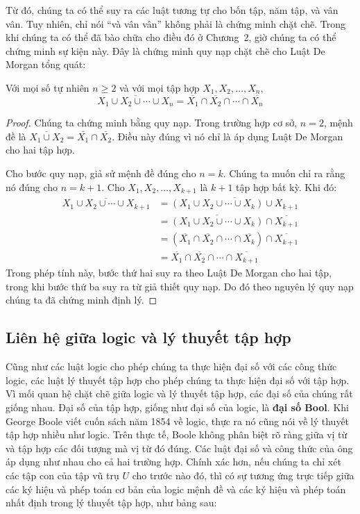 Từ đó, chúng ta có thể suy ra các luật tương tự cho bốn tập, năm tập, và vân vân. Tuy nhiên, chỉ nói ``và vân vân'' không phải là chứng minh chặt chẽ. Trong khi chúng ta có thể đã bào chữa cho điều đó ở Chương~2, giờ chúng ta có thể chứng minh sự kiện này. Đây là chứng minh quy nạp chặt chẽ cho Luật De Morgan tổng quát:

\begin{theorem}
\label{thm:4.5}
Với mọi số tự nhiên $n \geq 2$ và với mọi tập hợp $X_1, X_2, \ldots, X_n$,
\[
\overline{X_1 \cup X_2 \cup \cdots \cup X_n} = \overline{X_1} \cap \overline{X_2} \cap \cdots \cap \overline{X_n}
\]
\end{theorem}

\begin{proof}
Chúng ta chứng minh bằng quy nạp. Trong trường hợp cơ sở, $n = 2$, mệnh đề là $\overline{X_1 \cup X_2} = \overline{X_1} \cap \overline{X_2}$. Điều này đúng vì nó chỉ là áp dụng Luật De Morgan cho hai tập hợp.

Cho bước quy nạp, giả sử mệnh đề đúng cho $n = k$. Chúng ta muốn chỉ ra rằng nó đúng cho $n = k + 1$. Cho $X_1, X_2, \ldots, X_{k+1}$ là $k + 1$ tập hợp bất kỳ. Khi đó:
\begin{align*}
\overline{X_1 \cup X_2 \cup \cdots \cup X_{k+1}} &= \overline{(X_1 \cup X_2 \cup \cdots \cup X_k) \cup X_{k+1}} \\
&= \overline{(X_1 \cup X_2 \cup \cdots \cup X_k)} \cap \overline{X_{k+1}} \\
&= (\overline{X_1} \cap \overline{X_2} \cap \cdots \cap \overline{X_k}) \cap \overline{X_{k+1}} \\
&= \overline{X_1} \cap \overline{X_2} \cap \cdots \cap \overline{X_{k+1}}
\end{align*}
Trong phép tính này, bước thứ hai suy ra theo Luật De Morgan cho hai tập, trong khi bước thứ ba suy ra từ giả thiết quy nạp. Do đó theo nguyên lý quy nạp chúng ta đã chứng minh định lý.
\end{proof}

\subsection{Liên hệ giữa logic và lý thuyết tập hợp}

Cũng như các luật logic cho phép chúng ta thực hiện đại số với các công thức logic, các luật lý thuyết tập hợp cho phép chúng ta thực hiện đại số với tập hợp. Vì mối quan hệ chặt chẽ giữa logic và lý thuyết tập hợp, các đại số của chúng rất giống nhau. Đại số của tập hợp, giống như đại số của logic, là \textbf{đại số Bool}. Khi George Boole viết cuốn sách năm 1854 về logic, thực ra nó cũng nói về lý thuyết tập hợp nhiều như logic. Trên thực tế, Boole không phân biệt rõ ràng giữa vị từ và tập hợp các đối tượng mà vị từ đó đúng. Các luật đại số và công thức của ông áp dụng như nhau cho cả hai trường hợp. Chính xác hơn, nếu chúng ta chỉ xét các tập con của tập vũ trụ $U$ cho trước nào đó, thì có sự tương ứng trực tiếp giữa các ký hiệu và phép toán cơ bản của logic mệnh đề và các ký hiệu và phép toán nhất định trong lý thuyết tập hợp, như bảng sau:

